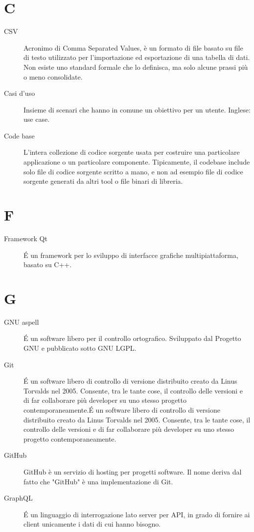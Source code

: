 \documentclass[a4paper, oneside]{article}
\begin{document}
\section{C}
\begin{description}
  \item[CSV] Acronimo di Comma Separated Values, è un formato di file basato su file di testo utilizzato per l'importazione ed esportazione di una tabella di dati. Non esiste uno standard formale che lo definisca, ma solo alcune prassi più o meno consolidate.
  \item[Casi d'uso] Insieme di scenari che hanno in comune un obiettivo per un utente. Inglese: use case.
  \item[Code base] L'intera collezione di codice sorgente usata per costruire una particolare applicazione o un particolare componente. Tipicamente, il codebase include solo file di codice sorgente scritto a mano, e non ad esempio file di codice sorgente generati da altri tool o file binari di libreria.
\end{description}
\newpage
\section{F}
\begin{description}
  \item[Framework Qt] É un framework per lo sviluppo di interfacce grafiche multipiattaforma, basato su C++.
\end{description}
\newpage
\section{G}
\begin{description}
  \item[GNU aspell] É un software libero per il controllo ortografico. Sviluppato dal Progetto GNU e pubblicato sotto GNU LGPL.
  \item[Git] É un software libero di controllo di versione distribuito creato da Linus Torvalds nel 2005. Consente, tra le tante cose, il controllo delle versioni e di far collaborare più developer su uno stesso progetto contemporaneamente.É un software libero di controllo di versione distribuito creato da Linus Torvalds nel 2005. Consente, tra le tante cose, il controllo delle versioni e di far collaborare più developer su uno stesso progetto contemporaneamente.
  \item[GitHub] GitHub è un servizio di hosting per progetti software. Il nome deriva dal fatto che "GitHub" è una implementazione di Git.
  \item[GraphQL] É un linguaggio di interrogazione lato server per API, in grado di fornire ai client unicamente i dati di cui hanno bisogno.
\end{description}
\newpage
\end{document}
